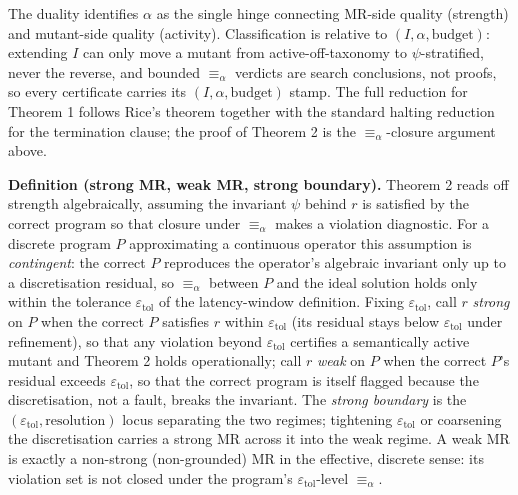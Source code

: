 \documentclass[12pt]{article}
\begin{document}
The duality identifies $\alpha$ as the single hinge connecting MR-side
quality (strength) and mutant-side quality (activity). Classification
is relative to $(I, \alpha, \text{budget})$: extending $I$ can only move
a mutant from active-off-taxonomy to $\psi$-stratified, never the
reverse, and bounded $\equiv_\alpha$ verdicts are search conclusions,
not proofs, so every certificate carries its $(I, \alpha, \text{budget})$
stamp. The full reduction for Theorem 1 follows Rice's theorem together
with the standard halting reduction for the termination clause; the
proof of Theorem 2 is the $\equiv_\alpha$-closure argument above.

\textbf{Definition (strong MR, weak MR, strong boundary).} Theorem 2
reads off strength algebraically, assuming the invariant $\psi$ behind
$r$ is satisfied by the correct program so that closure under
$\equiv_\alpha$ makes a violation diagnostic. For a discrete program $P$
approximating a continuous operator this assumption is \emph{contingent}:
the correct $P$ reproduces the operator's algebraic invariant only up to
a discretisation residual, so $\equiv_\alpha$ between $P$ and the ideal
solution holds only within the tolerance $\varepsilon_{\mathrm{tol}}$ of
the latency-window definition. Fixing $\varepsilon_{\mathrm{tol}}$, call
$r$ \emph{strong} on $P$ when the correct $P$ satisfies $r$ within
$\varepsilon_{\mathrm{tol}}$ (its residual stays below
$\varepsilon_{\mathrm{tol}}$ under refinement), so that any violation
beyond $\varepsilon_{\mathrm{tol}}$ certifies a semantically active
mutant and Theorem 2 holds operationally; call $r$ \emph{weak} on $P$
when the correct $P$'s residual exceeds $\varepsilon_{\mathrm{tol}}$, so
that the correct program is itself flagged because the discretisation,
not a fault, breaks the invariant. The \emph{strong boundary} is the
$(\varepsilon_{\mathrm{tol}}, \text{resolution})$ locus separating the
two regimes; tightening $\varepsilon_{\mathrm{tol}}$ or coarsening the
discretisation carries a strong MR across it into the weak regime. A weak
MR is exactly a non-strong (non-grounded) MR in the effective, discrete
sense: its violation set is not closed under the program's
$\varepsilon_{\mathrm{tol}}$-level $\equiv_\alpha$.
\end{document}
